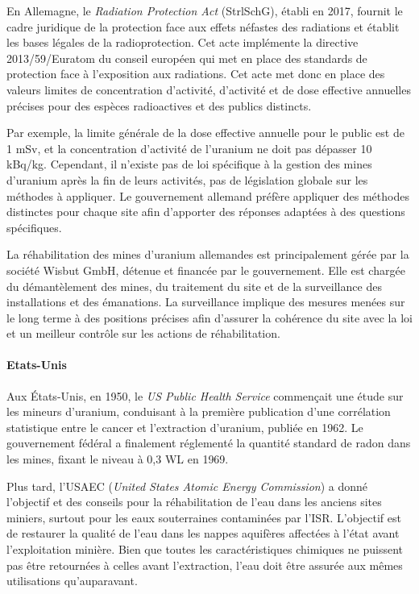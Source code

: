 \documentclass{article}
\begin{document}
En Allemagne, le \emph{Radiation Protection Act} (StrlSchG), établi en 2017, fournit le cadre juridique de la protection face aux effets néfastes des radiations et établit les bases légales de la radioprotection. Cet acte implémente la directive 2013/59/Euratom du conseil européen qui met en place des standards de protection face à l’exposition aux radiations. Cet acte met donc en place des valeurs limites de concentration d’activité, d’activité et de dose effective annuelles précises pour des espèces radioactives et des publics distincts. 


Par exemple, la limite générale de la dose effective annuelle pour le public est de 1 mSv, et la concentration d’activité de l’uranium ne doit pas dépasser 10 kBq/kg. Cependant, il n’existe pas de loi spécifique à la gestion des mines d’uranium après la fin de leurs activités, pas de législation globale sur les méthodes à appliquer. Le gouvernement allemand préfère appliquer des méthodes distinctes pour chaque site afin d’apporter des réponses adaptées à des questions spécifiques.

La réhabilitation des mines d’uranium allemandes est principalement gérée par la société Wisbut GmbH, détenue et financée par le gouvernement. Elle est chargée du démantèlement des mines, du traitement du site et de la surveillance des installations et des émanations. La surveillance implique des mesures menées sur le long terme à des positions précises afin d’assurer la cohérence du site avec la loi et un meilleur contrôle sur les actions de réhabilitation.

\paragraph{Etats-Unis}

Aux États-Unis, en 1950, le \textit{US Public Health Service} commençait une étude sur les mineurs d'uranium, conduisant à la première publication d'une corrélation statistique entre le cancer et l'extraction d'uranium, publiée en 1962. Le gouvernement fédéral a finalement réglementé la quantité standard de radon dans les mines, fixant le niveau à 0,3 WL en 1969. 

Plus tard, l'USAEC (\textit{United States Atomic Energy Commission}) a donné l’objectif et des conseils pour la réhabilitation de l’eau dans les anciens sites miniers, surtout pour les eaux souterraines contaminées par l'ISR. L’objectif est de restaurer la qualité de l'eau dans les nappes aquifères affectées à l’état avant l'exploitation minière. Bien que toutes les caractéristiques chimiques ne puissent pas être retournées à celles avant l'extraction, l'eau doit être assurée aux mêmes utilisations qu'auparavant. 
\end{document}

